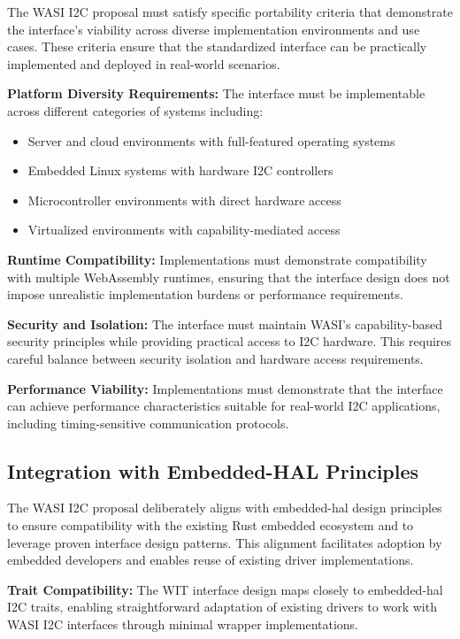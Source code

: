 The WASI I2C proposal must satisfy specific portability criteria that demonstrate the interface's viability across diverse implementation environments and use cases\cite{wasi_contributing}. These criteria ensure that the standardized interface can be practically implemented and deployed in real-world scenarios.

\textbf{Platform Diversity Requirements:} The interface must be implementable across different categories of systems including:
\begin{itemize}
    \item Server and cloud environments with full-featured operating systems
    \item Embedded Linux systems with hardware I2C controllers
    \item Microcontroller environments with direct hardware access
    \item Virtualized environments with capability-mediated access
\end{itemize}

\textbf{Runtime Compatibility:} Implementations must demonstrate compatibility with multiple WebAssembly runtimes, ensuring that the interface design does not impose unrealistic implementation burdens or performance requirements.

\textbf{Security and Isolation:} The interface must maintain WASI's capability-based security principles while providing practical access to I2C hardware. This requires careful balance between security isolation and hardware access requirements.

\textbf{Performance Viability:} Implementations must demonstrate that the interface can achieve performance characteristics suitable for real-world I2C applications, including timing-sensitive communication protocols.

\subsection{Integration with Embedded-HAL Principles}
\label{subsec:i2c-embedded-hal-integration}

The WASI I2C proposal deliberately aligns with embedded-hal design principles to ensure compatibility with the existing Rust embedded ecosystem and to leverage proven interface design patterns. This alignment facilitates adoption by embedded developers and enables reuse of existing driver implementations.

\textbf{Trait Compatibility:} The WIT interface design maps closely to embedded-hal I2C traits, enabling straightforward adaptation of existing drivers to work with WASI I2C interfaces through minimal wrapper implementations.

